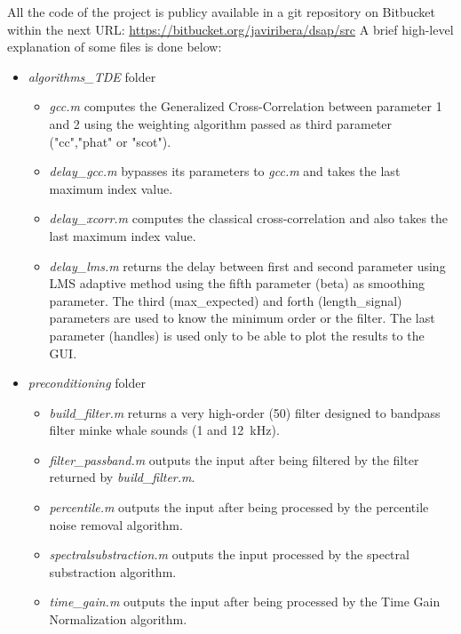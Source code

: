 All the code of the project is publicy available in a git repository on Bitbucket within the next URL: \url{https://bitbucket.org/javiribera/dsap/src}
A brief high-level explanation of some files is done below:
\newpage

\begin{itemize}
  \item \emph{algorithms\_TDE} folder
    \begin{itemize}
      \item \emph{gcc.m} \cite{gcc.m} computes the Generalized Cross-Correlation between parameter 1 and 2 using the weighting algorithm passed as third parameter ("cc","phat" or "scot").
      \item \emph{delay\_gcc.m} \cite{delaygcc.m} bypasses its parameters to \emph{gcc.m} and takes the last maximum index value.
      \item \emph{delay\_xcorr.m} \cite{delayxcorr.m} computes the classical cross-correlation and also takes the last maximum index value.
      \item \emph{delay\_lms.m} \cite{delaylms.m} returns the delay between first and second parameter using LMS adaptive method using the fifth parameter (beta) as smoothing parameter. The third (max\_expected) and forth (length\_signal) parameters are used to know the minimum order or the filter. The last parameter (handles) is used only to be able to plot the results to the GUI.
    \end{itemize}
    
  \item \emph{preconditioning} folder
    \begin{itemize}
      \item \emph{build\_filter.m} \cite{buildfilter.m} returns a very high-order (50) filter designed to bandpass filter minke whale sounds (1 and \SI{12}{\kilo\Hz}).
      \item \emph{filter\_passband.m} \cite{filterpassband.m} outputs the input after being filtered by the filter returned by \emph{build\_filter.m}.
      \item \emph{percentile.m} \cite{percentile.m} outputs the input after being processed by the percentile noise removal algorithm.
      \item \emph{spectralsubstraction.m} \cite{spectralsubstraction.m} outputs the input processed by the spectral substraction algorithm.
      \item \emph{time\_gain.m} \cite{timegain.m} outputs the input after being processed by the Time Gain Normalization algorithm.
    \end{itemize}
    

\end{itemize}
